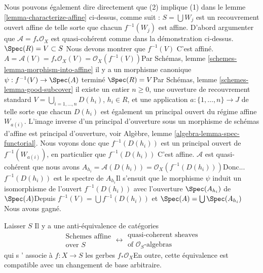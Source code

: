 \begin{remark}

\label{remark-direct-argument}

Nous pouvons également dire directement que (2) implique (1) dans le lemme \ref{lemma-characterize-affine} ci-dessus, comme suit : $S = \bigcup W_j$ est un recouvrement ouvert affine de telle sorte que chacun $f^{-1}(W_j)$ est affine. D'abord argumenter que $\mathcal{A} = f_*\mathcal{O}_X$ est quasi-cohérent comme dans la démonstration ci-dessus. $\Spec(R) = V \subset S$ Nous devons montrer que $f^{-1}(V)$ C'est affiné.
$A = \mathcal{A}(V) = f_*\mathcal{O}_X(V) = \mathcal{O}_X(f^{-1}(V))$Par Schémas, lemme \ref{schemes-lemma-morphism-into-affine} il y a un morphisme canonique $\psi : f^{-1}(V) \to \Spec(A)$ terminé
$\Spec(R) = V$Par Schémas, lemme \ref{schemes-lemma-good-subcover} il existe un entier $n \geq 0$, une ouverture de recouvrement standard
$V = \bigcup_{i = 1, \ldots, n} D(h_i)$, $h_i \in R$, et une application
$a : \{1, \ldots, n\} \to J$ de telle sorte que chacun $D(h_i)$ est également un principal ouvert du régime affine $W_{a(i)}$. L'image inverse d'un principal d'ouverture sous un morphisme de schémas d'affine est principal d'ouverture, voir Algèbre, lemme \ref{algebra-lemma-spec-functorial}. Nous voyons donc que $f^{-1}(D(h_i))$ est un principal ouvert de $f^{-1}(W_{a(i)})$, en particulier que $f^{-1}(D(h_i))$ C'est affine. $\mathcal{A}$
est quasi-cohérent que nous avons
$A_{h_i} = \mathcal{A}(D(h_i)) = \mathcal{O}_X(f^{-1}(D(h_i)))$Donc... $f^{-1}(D(h_i))$ est le spectre de $A_{h_i}$Il s'ensuit que le morphisme $\psi$ induit un isomorphisme de l'ouvert
$f^{-1}(D(h_i))$ avec l'ouverture $\Spec(A_{h_i})$ de
$\Spec(A)$Depuis $f^{-1}(V) = \bigcup f^{-1}(D(h_i))$
et $\Spec(A) = \bigcup \Spec(A_{h_i})$ Nous avons gagné.

\end{remark}

\begin{lemma}

\label{lemma-affine-equivalence-algebras}

Laisser $S$ Il y a une anti-équivalence de catégories
$$
\begin{matrix}
\text{Schemes affine} \\
\text{over }S
\end{matrix}
\longleftrightarrow
\begin{matrix}
\text{quasi-coherent sheaves} \\
\text{of }\mathcal{O}_S\text{-algebras}
\end{matrix}
$$
qui s ' associe à $f : X \to S$ les gerbes $f_*\mathcal{O}_X$En outre, cette équivalence est compatible avec un changement de base arbitraire.

\end{lemma}

